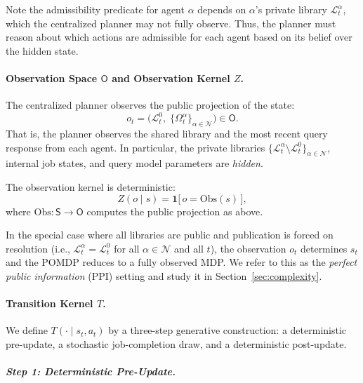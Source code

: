 \begin{remark}
\label{rem:centralized-admissibility}
Note the admissibility predicate for agent $\alpha$ depends on $\alpha$'s private library $\mathcal{L}^\alpha_t$, which the centralized planner may not fully observe. Thus, the planner must reason about which actions are admissible for each agent based on its belief over the hidden state. 
\end{remark}
 
 
\paragraph{Observation Space $\mathsf{O}$ and Observation Kernel $Z$.}
 
The centralized planner observes the public projection of the state:
\[
o_t =
\big(\mathcal{L}^0_t,\;\{\Omega^\alpha_t\}_{\alpha\in\mathcal{N}}\big)
\in\mathsf{O}.
\]
That is, the planner observes the shared library and the most recent query response from each agent. In particular, the private libraries $\{\mathcal{L}^\alpha_t\setminus\mathcal{L}^0_t\}_{\alpha\in\mathcal{N}}$, internal job states, and query model parameters are \emph{hidden}.
 
The observation kernel is deterministic:
\[
Z(o\mid s)=\mathbf{1}\!\big[\,o=\mathrm{Obs}(s)\,\big],
\]
where $\mathrm{Obs}:\mathsf{S}\to\mathsf{O}$ computes the public projection as above.
 
\begin{remark}
\label{rem:perfect-public-info}
In the special case where all libraries are public and publication is forced on resolution (i.e., $\mathcal{L}^\alpha_t = \mathcal{L}^0_t$ for all $\alpha\in\mathcal{N}$ and all $t$), the observation $o_t$ determines $s_t$ and the POMDP reduces to a fully observed MDP. We refer to this as the \emph{perfect public information} (PPI) setting and study it in Section~\ref{sec:complexity}.
\end{remark}
 
 
\paragraph{Transition Kernel $T$.}
 
We define $T(\cdot\mid s_t,a_t)$ by a three-step generative construction: a deterministic pre-update, a stochastic job-completion draw, and a deterministic post-update.
 
\subparagraph{Step 1: Deterministic Pre-Update.}
 
